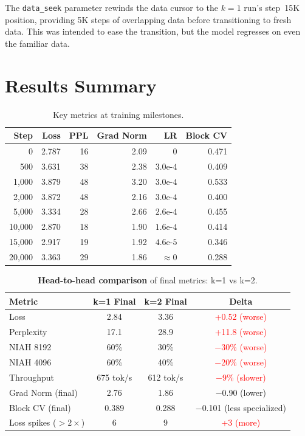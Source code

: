 \documentclass[11pt,a4paper]{article}
\begin{document}
\noindent The \texttt{data\_seek} parameter rewinds the data cursor to the $k{=}1$ run's step~15K
position, providing 5K steps of overlapping data before transitioning to fresh data. This was
intended to ease the transition, but the model regresses on even the familiar data.


\section{Results Summary}

\begin{table}[H]
\centering
\caption{Key metrics at training milestones.}
\label{tab:milestones}
\begin{tabular}{@{}rrrrrr@{}}
\toprule
\textbf{Step} & \textbf{Loss} & \textbf{PPL} & \textbf{Grad Norm} & \textbf{LR} & \textbf{Block CV} \\
\midrule
0       & 2.787 &  16 & 2.09 & 0              & 0.471 \\
500     & 3.631 &  38 & 2.38 & $3.0\text{e-}4$ & 0.409 \\
1{,}000 & 3.879 &  48 & 3.20 & $3.0\text{e-}4$ & 0.533 \\
2{,}000 & 3.872 &  48 & 2.16 & $3.0\text{e-}4$ & 0.400 \\
5{,}000 & 3.334 &  28 & 2.66 & $2.6\text{e-}4$ & 0.455 \\
10{,}000 & 2.870 & 18 & 1.90 & $1.6\text{e-}4$ & 0.414 \\
15{,}000 & 2.917 & 19 & 1.92 & $4.6\text{e-}5$ & 0.346 \\
20{,}000 & 3.363 & 29 & 1.86 & $\approx 0$    & 0.288 \\
\bottomrule
\end{tabular}
\end{table}

\begin{table}[H]
\centering
\caption{\textbf{Head-to-head comparison} of final metrics: k=1 vs k=2.}
\label{tab:comparison}
\begin{tabular}{@{}lccc@{}}
\toprule
\textbf{Metric} & \textbf{k=1 Final} & \textbf{k=2 Final} & \textbf{Delta} \\
\midrule
Loss             & 2.84  & 3.36  & \textcolor{red}{+0.52 (worse)} \\
Perplexity       & 17.1  & 28.9  & \textcolor{red}{+11.8 (worse)} \\
NIAH 8192        & 60\%  & 30\%  & \textcolor{red}{$-$30\% (worse)} \\
NIAH 4096        & 60\%  & 40\%  & \textcolor{red}{$-$20\% (worse)} \\
Throughput       & 675 tok/s & 612 tok/s & \textcolor{red}{$-$9\% (slower)} \\
Grad Norm (final)& 2.76  & 1.86  & $-$0.90 (lower) \\
Block CV (final) & 0.389 & 0.288 & $-$0.101 (less specialized) \\
Loss spikes ($>2\times$) & 6 & 9 & \textcolor{red}{+3 (more)} \\
\bottomrule
\end{tabular}
\end{table}
\end{document}
